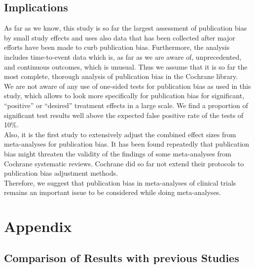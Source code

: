 \documentclass[11pt,a4paper,twoside]{book}\usepackage[]{graphicx}\usepackage[]{color}
\begin{document}
\section{Implications}
As far as we know, this study is so far the largest assessment of publication bias by small study effects and uses also data that has been collected after major efforts have been made to curb publication bias. %
Furthermore, the analysis includes time-to-event data which is, as far as we are aware of, unprecedented, and continuous outcomes, which is unusual. Thus we assume that it is so far the most complete, thorough analysis of publication bias in the Cochrane library. \\
We are not aware of any use of one-sided tests for publication bias as used in this study, which allows to look more specifically for publication bias for significant, ``positive'' or ``desired'' treatment effects in a large scale. We find a proportion of significant test results well above the expected false positive rate of the tests of 10\%.\\
Also, it is the first study to extensively adjust the combined effect sizes from meta-analyses for publication bias. It has been found repeatedly that publication bias might threaten the validity of the findings of some meta-analyses from Cochrane systematic reviews. Cochrane did so far not extend their protocols to publication bias adjustment methods.\\
Therefore, we suggest that publication bias in meta-analyses of clinical trials remains an important issue to be considered while doing meta-analyses. 


\appendix




\chapter{Appendix}\label{ch:Appendix}

\section{Comparison of Results with previous Studies}
\end{document}

